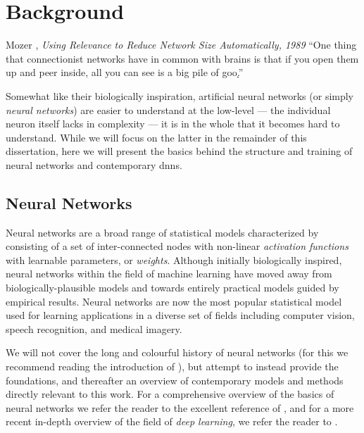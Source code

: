 \documentclass[thesis]{subfiles}
\begin{document}
\chapter{Background}
\label{background}
\begin{chapquote}{Mozer \etal, \textit{Using Relevance to Reduce Network Size Automatically, 1989}}
    ``One thing that connectionist networks have in common with brains is that if you open them up and peer inside, all you can see is a big pile of goo\href{https://yani.io/thesiseasteregg.html}{.}''
\end{chapquote}
Somewhat like their biologically inspiration, artificial neural networks (or simply \emph{neural networks}) are easier to understand at the low-level --- the individual neuron itself lacks in complexity --- it is in the whole that it becomes hard to understand. While we will focus on the latter in the remainder of this dissertation, here we will present the basics behind the structure and training of neural networks and contemporary \glspl{dnn}.

\section{Neural Networks}
Neural networks are a broad range of statistical models characterized by consisting of a set of inter-connected nodes with non-linear \emph{activation functions} with learnable parameters, or \emph{weights}.
 Although initially biologically inspired, neural networks within the field of machine learning have moved away from biologically-plausible models and towards entirely practical models guided by empirical results. Neural networks are now the most popular statistical model used for learning applications in a diverse set of fields including computer vision, speech recognition, and medical imagery. 

We will not cover the long and colourful history of neural networks (for this we recommend reading the introduction of \citet{goodfellow2016deep}), but attempt to instead provide the foundations, and thereafter an overview of contemporary models and methods directly relevant to this work. For a comprehensive overview of the basics of neural networks we refer the reader to the excellent reference of \citet{Bishop1995}, and for a more recent  in-depth overview of the field of \emph{deep learning}, we refer the reader to \citet{goodfellow2016deep}. 
\end{document}
